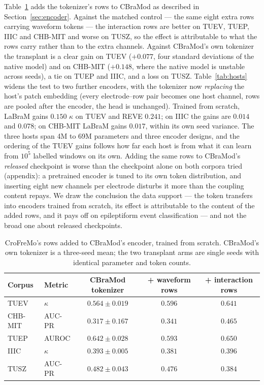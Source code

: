 Table~\ref{tab:transplant} adds the tokenizer's rows to CBraMod as
described in Section~\ref{sec:encoder}. Against the matched control ---
the same eight extra rows carrying waveform tokens --- the interaction
rows are better on TUEV, TUEP, IIIC and CHB-MIT and worse on TUSZ, so
the effect is attributable to what the rows carry rather than to the
extra channels. Against CBraMod's own tokenizer the transplant is a clear
gain on TUEV ($+0.077$, four standard deviations of the native model) and
on CHB-MIT ($+0.148$, where the native model is unstable across seeds), a
tie on TUEP and IIIC, and a loss on TUSZ.
Table~\ref{tab:hosts} widens the test to two further encoders, with
the tokenizer now \emph{replacing} the host's patch embedding (every
electrode--row pair becomes one host channel, rows are pooled after the
encoder, the head is unchanged). Trained from scratch, LaBraM gains
$0.150$ $\kappa$ on TUEV and REVE $0.241$; on IIIC the gains are
$0.014$ and $0.078$; on CHB-MIT LaBraM gains $0.017$, within its own
seed variance. The three hosts span 4M to 69M parameters and three
encoder designs, and the ordering of the TUEV gains follows how far each
host is from what it can learn from $10^5$ labelled windows on its own.
Adding the same rows to CBraMod's \emph{released} checkpoint is worse
than the checkpoint alone on both corpora tried (appendix): a pretrained
encoder is tuned to its own token distribution, and inserting eight new
channels per electrode disturbs it more than the coupling content
repays. We draw the conclusion the data support --- the token transfers
into encoders trained from scratch, its effect is attributable to the
content of the added rows, and it pays off on epileptiform event
classification --- and not the broad one about released checkpoints.

\begin{table}[t]
\centering
\small
\caption{CroFreMo's rows added to CBraMod's encoder, trained from scratch.
CBraMod's own tokenizer is a three-seed mean; the two transplant arms are
single seeds with identical parameter and token counts.}
\label{tab:transplant}
\begin{tabular}{llccc}
\toprule
Corpus & Metric & CBraMod tokenizer & + waveform rows & + interaction rows \\
\midrule
TUEV & $\kappa$ & $0.564 \pm 0.019$ & $0.596$ & $\mathbf{0.641}$ \\
CHB-MIT & AUC-PR & $0.317 \pm 0.167$ & $0.341$ & $\mathbf{0.465}$ \\
TUEP & AUROC & $0.642 \pm 0.028$ & $0.593$ & $\mathbf{0.650}$ \\
IIIC & $\kappa$ & $0.393 \pm 0.005$ & $0.381$ & $0.396$ \\
TUSZ & AUC-PR & $\mathbf{0.482 \pm 0.043}$ & $0.476$ & $0.384$ \\
\bottomrule
\end{tabular}
\end{table}

